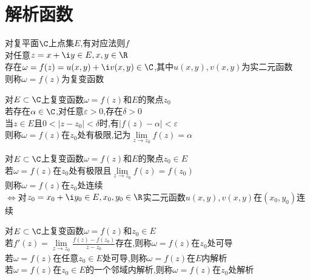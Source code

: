 

%

\setcounter{section}{0}
\setcounter{subsection}{0}

\chapter{解析函数}

\begin{dingyi}
对复平面$\C$上点集$E$,有对应法则$f$\\
对任意$z=x+\i y\in E,x,y\in\R$\\
存在$\omega=f(z)=u(x,y)+\i v(x,y)\in \C$,其中$u(x,y),v(x,y)$为实二元函数\\
则称$\omega=f(z)$为复变函数
\end{dingyi}

\begin{dingyi}
对$E\subset \C$上复变函数$\omega=f(z)$和$E$的聚点$z_0$\\
若存在$\alpha\in \C$,对任意$\varepsilon>0$,存在$\delta>0$\\
当$z\in E$且$0<|z-z_0|<\delta$时,有$|f(z)-\alpha|<\varepsilon$\\
则称$\omega=f(z)$在$z_0$处有极限,记为$\lim\limits_{z\to z_0}f(z)=\alpha$
\end{dingyi}

\begin{dingyi}
对$E\subset \C$上复变函数$\omega=f(z)$和$E$的聚点$z_0\in E$\\
若$\omega=f(z)$在$z_0$处有极限且$\lim\limits_{z\to z_0}f(z)=f(z_0)$\\
则称$\omega=f(z)$在$z_0$处连续\\
$\Leftrightarrow$对$z_0=x_0+\i y_0\in E,x_0,y_0\in \R$实二元函数$u(x,y),v(x,y)$在$(x_0,y_0)$连续
\end{dingyi}

\begin{dingyi}
对$E\subset \C$上复变函数$\omega=f(z)$和$z_0\in E$\\
若$f'(z)=\lim\limits_{z\to z_0}\frac{f(z)-f(z_0)}{z-z_0}$存在,则称$\omega=f(z)$在$z_0$处可导\\
若$\omega=f(z)$在任意$z_0\in E$处可导,则称$\omega=f(z)$在$E$内解析\\
若$\omega=f(z)$在$z_0\in E$的一个邻域内解析,则称$\omega=f(z)$在$z_0$处解析
\end{dingyi}

